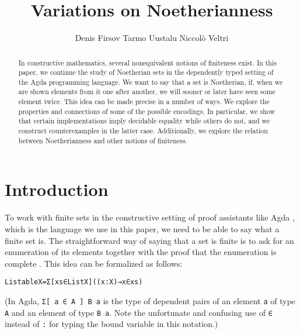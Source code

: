 \documentclass{eptcs}
\title{Variations on Noetherianness}
\author{
Denis Firsov \qquad\qquad Tarmo Uustalu \qquad \qquad Niccolò Veltri
\institute{Institute of Cybernetics at Tallinn University of Technology, Estonia}
\email{ \{denis,tarmo,niccolo\}@cs.ioc.ee }
}
\begin{document}
\maketitle

\begin{abstract}
  In constructive mathematics, several nonequivalent notions of
  finiteness exist. In this paper, we continue the study of Noetherian
  sets in the dependently typed setting of the Agda programming
  language. We want to say that a set is Noetherian, if, when we are
  shown elements from it one after another, we will sooner or later
  have seen some element twice. This idea can be made precise in a
  number of ways. We explore the properties and connections of some of
  the possible encodings. In particular, we show that certain
  implementations imply decidable equality while others do not, and we
  construct counterexamples in the latter case. Additionally, we
  explore the relation between Noetherianness and other notions of
  finiteness.
\end{abstract}

\section{Introduction}
\label{introduction}

To work with finite sets in the constructive setting of proof
assistants like Agda \cite{Agda}, which is the language we use in this
paper, we need to be able to say what a finite set is.  The
straightforward way of saying that a set is finite is to ask for an
enumeration of its elements together with the proof that the
enumeration is complete \cite{Kuratowski}. This idea can be formalized
as follows:
\begin{alltt}
Listable X = Σ[ xs ∈ List X ] ((x : X) → x ∈ xs)
\end{alltt}
(In Agda, \verb;Σ[ a ∈ A ] B a; is the type of dependent pairs of an
element \verb;a; of type \verb;A; and an element of type \verb;B a;. 
Note the unfortunate and confusing use of \verb;∈; instead of
\verb;:; for typing the bound variable in this notation.)
\end{document}
